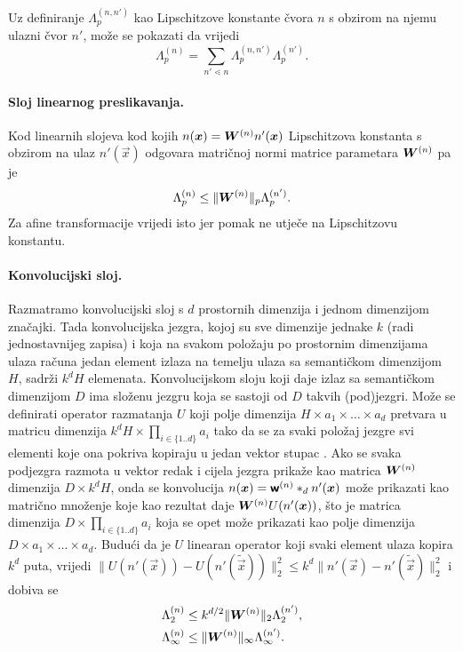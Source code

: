 \documentclass[utf8, seminar, numeric, lmodern]{feri}
\begin{document}
Uz definiranje $\Lambda_p^{(n,n')}$ kao Lipschitzove konstante čvora $n$ s obzirom na njemu ulazni čvor $n'$, može se pokazati da vrijedi
\begin{equation}
\Lambda_p^{(n)} = \sum_{n'\lessdot n}
\Lambda_p^{(n,n')}\Lambda_p^{(n')}.
\end{equation}

\paragraph{Sloj linearnog preslikavanja.} Kod linearnih slojeva kod kojih $n(\bm{x})=\bm{W}^{(n)}n'(\bm{x})$ Lipschitzova konstanta s obzirom na ulaz $n'(\vec x)$ odgovara matričnoj normi matrice parametara $\bm{W}^{(n)}$ pa je 
\begin{equation}
\Lambda_p^{(n)} \leq \lVert \bm{W}^{(n)}\rVert_p\Lambda_p^{(n')}.
\end{equation}
Za afine transformacije vrijedi isto jer pomak ne utječe na Lipschitzovu konstantu.

\paragraph{Konvolucijski sloj.} Razmatramo konvolucijski sloj s $d$ prostornih dimenzija i jednom dimenzijom značajki. Tada konvolucijska jezgra, kojoj su sve dimenzije jednake $k$ (radi jednostavnijeg zapisa) i koja na svakom položaju po prostornim dimenzijama ulaza računa jedan element izlaza na temelju ulaza sa semantičkom dimenzijom $H$, sadrži $k^dH$ elemenata. Konvolucijskom sloju koji daje izlaz sa semantičkom dimenzijom $D$ ima složenu jezgru koja se sastoji od $D$ takvih (pod)jezgri. Može se definirati operator razmatanja $U$ koji polje dimenzija $H\times a_1\times\dots\times a_d$ pretvara u matricu dimenzija $k^dH\times \prod_{i\in\{1..d\}}a_i$ tako da se za svaki položaj jezgre svi elementi koje ona pokriva kopiraju u jedan vektor stupac \cite{sharan-epdl}. Ako se svaka podjezgra razmota u vektor redak i cijela jezgra prikaže kao matrica $\bm{W}^{(n)}$ dimenzija $D\times k^dH$, onda se konvolucija $n(\bm{x}) = \bm{\mathsf{w}}^{(n)}*_d n'(\bm{x})$ može prikazati kao matrično množenje koje kao rezultat daje $\bm{W}^{(n)}U(n'(\bm{x}))$,
što je matrica dimenzija $D\times \prod_{i\in\{1..d\}}a_i$ koja se opet može prikazati kao polje dimenzija $D\times a_1\times\dots\times a_d$. Budući da je $U$ linearan operator koji svaki element ulaza kopira $k^d$ puta, vrijedi $\lVert U(n'(\vec x))-U(n'(\widetilde{\vec x}))\rVert_2^2 \leq k^d\lVert n'(\vec x)-n'(\widetilde{\vec x})\rVert_2^2$ i dobiva se
\begin{align} \label{eq:konv-lipschitz}
\Lambda_2^{(n)} &\leq k^{d/2} \lVert \bm{W}^{(n)}\rVert_2\Lambda_2^{(n')}, \\ \Lambda_\infty^{(n)} &\leq \lVert \bm{W}^{(n)}\rVert_\infty\Lambda_\infty^{(n')}.
\end{align}
\end{document}
